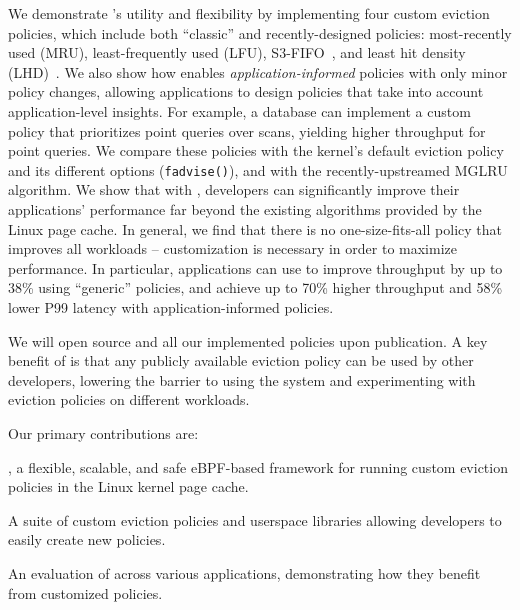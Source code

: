 We demonstrate \name's utility and flexibility by implementing four custom eviction policies, which include both ``classic'' and recently-designed policies: most-recently used (MRU), least-frequently used (LFU), S3-FIFO~\cite{s3-fifo}, and least hit density (LHD)~\cite{lhd}.
We also show how \name enables \emph{application-informed} policies with only minor policy changes, allowing applications to design policies that take into account application-level insights.
For example, a database can implement a custom policy that prioritizes point queries over scans, yielding higher throughput for point queries.
We compare these \name policies with the kernel's default eviction policy and its different options (\eg \texttt{fadvise()}), and with the recently-upstreamed MGLRU algorithm. We show that with \name, developers can significantly improve their applications' performance far beyond the existing algorithms provided by the Linux page cache.
In general, we find that there is no one-size-fits-all policy that improves all workloads -- customization is necessary in order to maximize performance. %
In particular, applications can use \name to improve throughput by up to 38\% using ``generic'' policies, and achieve up to 70\% higher throughput and 58\% lower P99 latency with application-informed policies.





We will open source \name and all our implemented policies upon publication. A key benefit of \name is that any publicly available eviction policy can be used by other developers, lowering the barrier to using the system and experimenting with eviction policies on different workloads. 

Our primary contributions are:
\begin{denseitemize}
\item \name, a flexible, scalable, and safe eBPF-based framework for running custom eviction policies in the Linux kernel page cache.
\item A suite of custom eviction policies and userspace libraries allowing developers to easily create new policies.
\item An evaluation of \name across various applications, demonstrating how they benefit from customized policies.
\end{denseitemize}

